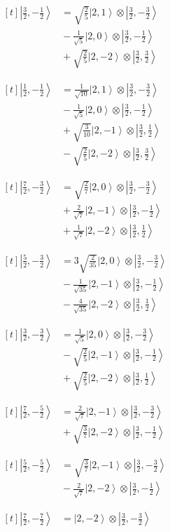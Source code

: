 \documentclass[11pt,a4paper]{article}
\newcommand{\estadocelda}[1]{%
  \begin{minipage}[t]{0.48\linewidth}
  \small\raggedright
  \(\displaystyle\begin{aligned}[t]#1\end{aligned}\)
  \end{minipage}%
}
\newcommand{\ket}[1]{\left|#1\right\rangle}
\begin{document}
\noindent\estadocelda{
\ket{\frac{3}{2},-\frac{1}{2}} &= \sqrt{\frac{2}{5}}\ket{2,1}\otimes\ket{\frac{3}{2},-\frac{3}{2}} \\
 &{}-\frac{1}{\sqrt{5}}\ket{2,0}\otimes\ket{\frac{3}{2},-\frac{1}{2}} \\
 &{}+\sqrt{\frac{2}{5}}\ket{2,-2}\otimes\ket{\frac{3}{2},\frac{3}{2}}
}\hfill\estadocelda{
\ket{\frac{1}{2},-\frac{1}{2}} &= \frac{1}{\sqrt{10}}\ket{2,1}\otimes\ket{\frac{3}{2},-\frac{3}{2}} \\
 &{}-\frac{1}{\sqrt{5}}\ket{2,0}\otimes\ket{\frac{3}{2},-\frac{1}{2}} \\
 &{}+\sqrt{\frac{3}{10}}\ket{2,-1}\otimes\ket{\frac{3}{2},\frac{1}{2}} \\
 &{}-\sqrt{\frac{2}{5}}\ket{2,-2}\otimes\ket{\frac{3}{2},\frac{3}{2}}
}\par\addvspace{1.4em}

\noindent\estadocelda{
\ket{\frac{7}{2},-\frac{3}{2}} &= \sqrt{\frac{2}{7}}\ket{2,0}\otimes\ket{\frac{3}{2},-\frac{3}{2}} \\
 &{}+\frac{2}{\sqrt{7}}\ket{2,-1}\otimes\ket{\frac{3}{2},-\frac{1}{2}} \\
 &{}+\frac{1}{\sqrt{7}}\ket{2,-2}\otimes\ket{\frac{3}{2},\frac{1}{2}}
}\hfill\estadocelda{
\ket{\frac{5}{2},-\frac{3}{2}} &= 3\sqrt{\frac{2}{35}}\ket{2,0}\otimes\ket{\frac{3}{2},-\frac{3}{2}} \\
 &{}-\frac{1}{\sqrt{35}}\ket{2,-1}\otimes\ket{\frac{3}{2},-\frac{1}{2}} \\
 &{}-\frac{4}{\sqrt{35}}\ket{2,-2}\otimes\ket{\frac{3}{2},\frac{1}{2}}
}\par\addvspace{1.4em}

\noindent\estadocelda{
\ket{\frac{3}{2},-\frac{3}{2}} &= \frac{1}{\sqrt{5}}\ket{2,0}\otimes\ket{\frac{3}{2},-\frac{3}{2}} \\
 &{}-\sqrt{\frac{2}{5}}\ket{2,-1}\otimes\ket{\frac{3}{2},-\frac{1}{2}} \\
 &{}+\sqrt{\frac{2}{5}}\ket{2,-2}\otimes\ket{\frac{3}{2},\frac{1}{2}}
}\hfill\estadocelda{
\ket{\frac{7}{2},-\frac{5}{2}} &= \frac{2}{\sqrt{7}}\ket{2,-1}\otimes\ket{\frac{3}{2},-\frac{3}{2}} \\
 &{}+\sqrt{\frac{3}{7}}\ket{2,-2}\otimes\ket{\frac{3}{2},-\frac{1}{2}}
}\par\addvspace{1.4em}

\noindent\estadocelda{
\ket{\frac{5}{2},-\frac{5}{2}} &= \sqrt{\frac{3}{7}}\ket{2,-1}\otimes\ket{\frac{3}{2},-\frac{3}{2}} \\
 &{}-\frac{2}{\sqrt{7}}\ket{2,-2}\otimes\ket{\frac{3}{2},-\frac{1}{2}}
}\hfill\estadocelda{
\ket{\frac{7}{2},-\frac{7}{2}} &= \ket{2,-2}\otimes\ket{\frac{3}{2},-\frac{3}{2}}
}\par\addvspace{1.4em}
\end{document}
